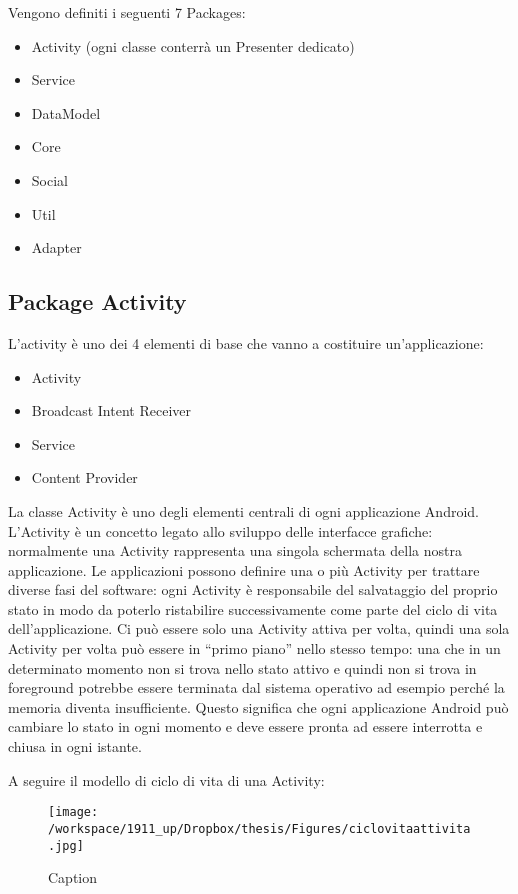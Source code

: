 Vengono definiti i seguenti 7 Packages:

\begin{itemize}
\item Activity (ogni classe conterrà un Presenter dedicato)
\item Service
\item DataModel
\item Core
\item Social
\item Util
\item Adapter
\end{itemize}

\subsection{Package Activity}

L'activity è uno dei 4 elementi di base che vanno a costituire un'applicazione:

\begin{itemize}
\item Activity
\item Broadcast Intent Receiver
\item Service
\item Content Provider
\end{itemize}

La classe Activity è uno degli elementi centrali di ogni applicazione Android. L'Activity è un concetto legato allo sviluppo delle interfacce grafiche: normalmente una Activity rappresenta una singola schermata della nostra applicazione. Le applicazioni possono definire una o più Activity per trattare diverse fasi del software: ogni Activity è responsabile del salvataggio del proprio stato in modo da poterlo ristabilire successivamente come parte del ciclo di vita dell'applicazione.
Ci può essere solo una Activity attiva per volta, quindi una sola Activity per volta può essere in “primo piano” nello stesso tempo: una che in un determinato momento non si trova nello stato attivo e quindi non si trova in foreground potrebbe essere terminata dal sistema operativo ad esempio perché la memoria diventa insufficiente. Questo significa che ogni applicazione Android può cambiare lo stato in ogni momento e deve essere pronta ad essere interrotta e chiusa in ogni istante.

A seguire il modello di ciclo di vita di una Activity:

\begin{figure}[h]\centering  
\texttt{[image: /workspace/1911\_up/Dropbox/thesis/Figures/ciclovitaattivita.jpg]}
\caption[Long caption]{Caption}
\label{pic-a}
\end{figure}


